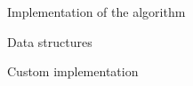 \documentclass[9pt]{extarticle}
\begin{document}
\begin{section}{Implementation of the algorithm}
\begin{subsection}{Data structures}
            
        \end{subsection}
        
        \begin{subsection}{Custom implementation}



\end{subsection}
\end{section}
\end{document}
